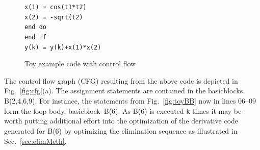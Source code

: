 \documentclass{book}
\newcommand{\basicblock}{basicblock}
\newcommand{\refsec}[1]{{Sec.~\ref{#1}}}
\newcommand{\reffig}[1]{{Fig.~\ref{#1}}}
\begin{document}
\begin{figure}
\begin{center}
\begin{minipage}{.5\textwidth}
\begin{tabbing}
        \hspace{.6cm}{\footnotesize \bf 08}\hspace{.5cm} \>\>\lstinline{x(1) = cos(t1*t2) } \\
        \hspace{.6cm}{\footnotesize \bf 09}\hspace{.5cm} \>\>\lstinline{x(2) = -sqrt(t2) } \\
        \hspace{.6cm}{\footnotesize \bf 10}\hspace{.5cm} \>\lstinline{end do } \\
        \hspace{.6cm}{\footnotesize \bf 11}\hspace{.5cm} \lstinline{end if } \\
        \hspace{.6cm}{\footnotesize \bf 12}\hspace{.5cm} \lstinline{y(k) = y(k)+x(1)*x(2) } 
      \end{tabbing}
    \end{minipage}
  \end{center}
  \caption{Toy example code with control flow}\label{fig:toy}
\end{figure}
The control flow graph (CFG) \cite{ASU86} resulting from the above code is depicted in 
\reffig{fig:cfg}(a).
The assignment statements are contained in the {\basicblock}s B(2,4,6,9).
For instance, 
the statements from \reffig{fig:toyBB} now  in lines 06--09 form the loop body, \basicblock\ B(6).
As B(6) is executed
\lstinline{k} times it may be worth putting
additional effort into the optimization of the derivative code 
generated for B(6) by optimizing the elimination sequence as illustrated in 
\refsec{sec:elimMeth}.
\end{document}
